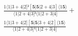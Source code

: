 \documentclass[varwidth, border=5pt]{standalone}
\begin{document}
\begin{my}
$\begin{gathered}
\scriptscriptstyle\frac{1⟨1|3+4|2]²[𝟓|𝟓|2+4|3]⟨1𝟓⟩}{⟨1|2+4|3]³⟨1|2+3|4]} +\\
\scriptscriptstyle\frac{1⟨1|3+4|2][𝟓|𝟓|3+4|2]⟨1𝟓⟩}{⟨1|2+4|3]²⟨1|2+3|4]} \phantom{+}
\end{gathered}$
\end{my}
\end{document}
